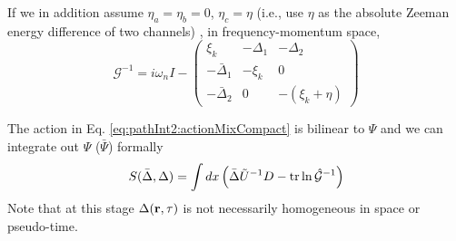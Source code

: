 
If we in addition assume $\eta_{a}=\eta_{b}=0$, $\eta_{c}=\eta$ (i.e., use $\eta$ as the absolute Zeeman energy difference of two channels)  , in frequency-momentum space, 
\begin{equation}\label{eq:pathInt2:nG}
\mathcal{G}^{-1}=i\omega_{n}I-
\begin{pmatrix}
\xi_{k}&-\Delta_{1}&-\Delta_{2}\\
-\bar{\Delta}_{1}&-\xi_{k}&0\\
-\bar{\Delta}_{2}&0&-(\xi_{k}+\eta)
\end{pmatrix}
\end{equation}



The action in Eq. \ref{eq:pathInt2:actionMixCompact} is  bilinear to $\Psi$ and we can integrate  out $\Psi$ ($\bar\Psi$) formally
\begin{equation}\label{eq:pathInt2:actionD}
S(\bar{\Delta},\Delta)=\int{dx}\left(\bar{\Delta}\tilde{U}^{-1}D-\text{tr}\ln\hat{\mathcal{G}}^{-1}\right)
\end{equation}
Note that at this stage $\Delta(\mathbf{r},\tau)$  is not necessarily homogeneous in space or pseudo-time.  



